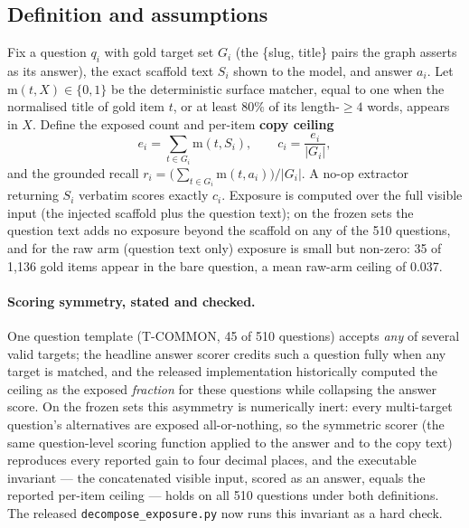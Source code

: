\subsection{Definition and assumptions}
Fix a question $q_i$ with gold target set $G_i$ (the \{slug, title\} pairs the graph asserts as its answer), the exact scaffold text $S_i$ shown to the model, and answer $a_i$. Let $\mathrm{m}(t,X)\in\{0,1\}$ be the deterministic surface matcher, equal to one when the normalised title of gold item $t$, or at least $80\%$ of its length-$\geq4$ words, appears in $X$. Define the exposed count and per-item \textbf{copy ceiling}
\[
  e_i=\sum_{t\in G_i}\mathrm{m}(t,S_i),\qquad
  c_i=\frac{e_i}{|G_i|},
\]
and the grounded recall $r_i=\bigl(\sum_{t\in G_i}\mathrm{m}(t,a_i)\bigr)/|G_i|$. A no-op extractor returning $S_i$ verbatim scores exactly $c_i$. Exposure is computed over the full visible input (the injected scaffold plus the question text); on the frozen sets the question text adds no exposure beyond the scaffold on any of the 510 questions, and for the raw arm (question text only) exposure is small but non-zero: 35 of 1{,}136 gold items appear in the bare question, a mean raw-arm ceiling of 0.037.

\paragraph{Scoring symmetry, stated and checked.} One question template (T-COMMON, 45 of 510 questions) accepts \emph{any} of several valid targets; the headline answer scorer credits such a question fully when any target is matched, and the released implementation historically computed the ceiling as the exposed \emph{fraction} for these questions while collapsing the answer score. On the frozen sets this asymmetry is numerically inert: every multi-target question's alternatives are exposed all-or-nothing, so the symmetric scorer (the same question-level scoring function applied to the answer and to the copy text) reproduces every reported gain to four decimal places, and the executable invariant --- the concatenated visible input, scored as an answer, equals the reported per-item ceiling --- holds on all 510 questions under both definitions. The released \texttt{decompose\_exposure.py} now runs this invariant as a hard check.

